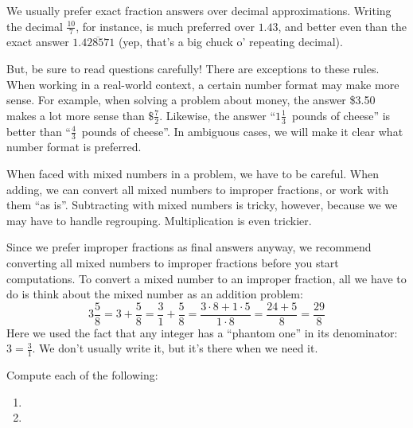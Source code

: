 We usually prefer exact fraction answers over decimal approximations. Writing the decimal $\frac{10}{7}$, for instance, is much preferred over $1.43$, and better even than the exact answer $1.\overline{428571}$ (yep, that's a big chuck o' repeating decimal).

But, be sure to read questions carefully! There are exceptions to these rules. When working in a real-world context, a certain number format may make more sense. For example, when solving a problem about money, the answer \$3.50 makes a lot more sense than $\$\frac{7}{2}$. Likewise, the answer ``$1\frac{1}{3}$~pounds of cheese'' is better than ``$\frac{4}{3}$~pounds of cheese''. In ambiguous cases, we will make it clear what number format is preferred.

When faced with mixed numbers in a problem, we have to be careful. When adding, we can convert all mixed numbers to improper fractions, or work with them ``as is''. Subtracting with mixed numbers is tricky, however, because we we may have to handle regrouping. Multiplication is even trickier.

Since we prefer improper fractions as final answers anyway, we recommend converting all mixed numbers to improper fractions before you start computations. To convert a mixed number to an improper fraction, all we have to do is think about the mixed number as an addition problem:
\[3\frac{5}{8} = 3 + \frac{5}{8} = \frac{3}{1} + \frac{5}{8} = \frac{3 \cdot 8 + 1 \cdot 5}{1 \cdot 8} = \frac{24 + 5}{8} = \frac{29}{8}\]
Here we used the fact that any integer has a ``phantom one'' in its denominator: $3 = \frac{3}{1}$. We don't usually write it, but it's there when we need it.

\begin{boxedex}
Compute each of the following:

\begin{enumerate}[itemsep=10pt]
\item {}

\item {}
\end{enumerate}
\end{boxedex}

